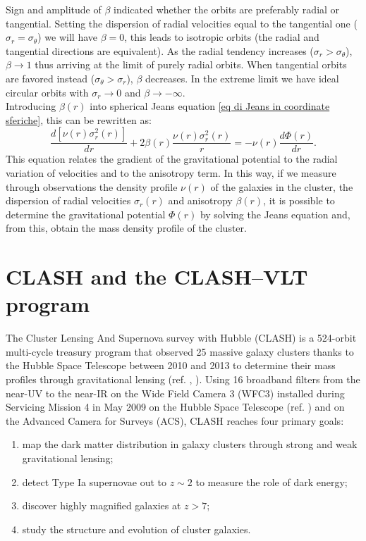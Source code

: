 Sign and amplitude of $\beta$ indicated whether the orbits are preferably radial or tangential.
Setting the dispersion of radial velocities equal to the tangential one ($\sigma_r = \sigma_\theta$) we will have $\beta = 0$, this leads to isotropic orbits (the radial and tangential directions are equivalent). As the radial tendency increases ($\sigma_r > \sigma_\theta$), $\beta \rightarrow 1$ thus arriving at the limit of purely radial orbits. When tangential orbits are favored instead ($\sigma_\theta > \sigma_r$), $\beta$ decreases. In the extreme limit we have ideal circular orbits with $\sigma_r \rightarrow 0$ and $\beta \rightarrow -\infty$.\\
Introducing $\beta(r)$ into spherical Jeans equation \eqref{eq di Jeans in coordinate sferiche}, this can be rewritten as:
\begin{equation}\label{Equazione di Jeans sferica}
    \frac{d[\nu(r) \sigma_r^2(r)]}{dr} + 2\beta(r)\frac{\nu(r)\sigma_r^2(r)}{r} = -\nu(r)\frac{d\Phi(r)}{dr}.
\end{equation}
This equation relates the gradient of the gravitational potential to the radial variation of velocities and to the anisotropy term. In this way, if we measure through observations the density profile $\nu(r)$ of the galaxies in the cluster, the dispersion of radial velocities $\sigma_r(r)$ and anisotropy $\beta(r)$, it is possible to determine the gravitational potential $\Phi(r)$ by solving the Jeans equation and, from this, obtain the mass density profile of the cluster.


\section{CLASH and the CLASH--VLT program}
The Cluster Lensing And Supernova survey with Hubble (CLASH) is a 524-orbit multi-cycle treasury program that observed 25 massive galaxy clusters thanks to the Hubble Space Telescope between 2010 and 2013 to determine their mass profiles through gravitational lensing (ref. \cite{Postman_2012}, \cite{clash_stsci}).
Using 16 broadband filters from the near-UV to the near-IR on the Wide Field Camera 3 (WFC3) installed during Servicing Mission 4 in May 2009 on the Hubble Space Telescope (ref. \cite{WFC3_SM4}) and on the Advanced Camera for Surveys (ACS), CLASH reaches four primary goals:
\begin{enumerate}
  \item map the dark matter distribution in galaxy clusters through strong and weak gravitational lensing;
  \item detect Type Ia supernovae out to $z \sim 2$ to measure the role of dark energy;
  \item discover highly magnified galaxies at $z > 7$;
  \item study the structure and evolution of cluster galaxies.
\end{enumerate}

